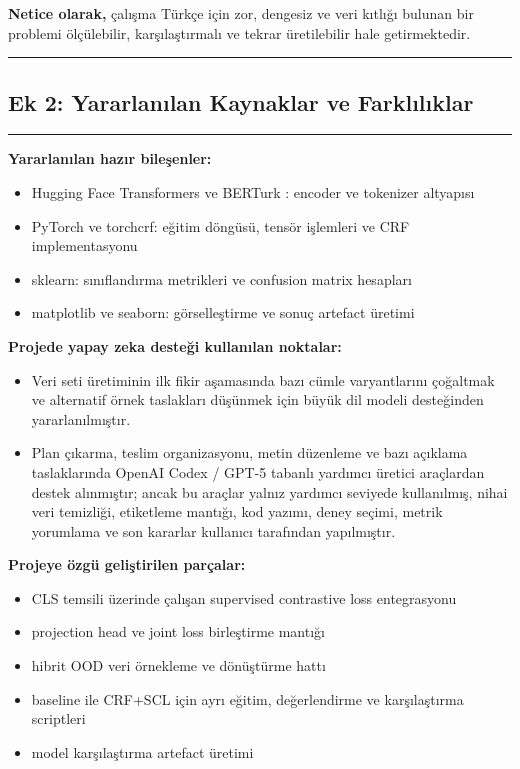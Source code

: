 \documentclass[conference]{IEEEtran}
\begin{document}
\textbf{Netice olarak,} çalışma Türkçe için zor, dengesiz ve veri kıtlığı bulunan bir problemi ölçülebilir, karşılaştırmalı ve tekrar üretilebilir hale getirmektedir.

\noindent\rule{\textwidth}{1pt}
\subsection*{\Large Ek 2: Yararlanılan Kaynaklar ve Farklılıklar}
\noindent\rule{\textwidth}{0.5pt}

\textbf{Yararlanılan hazır bileşenler:}
\begin{itemize}
    \item Hugging Face Transformers ve BERTurk \cite{stefanit}: encoder ve tokenizer altyapısı
    \item PyTorch ve torchcrf: eğitim döngüsü, tensör işlemleri ve CRF implementasyonu
    \item sklearn: sınıflandırma metrikleri ve confusion matrix hesapları
    \item matplotlib ve seaborn: görselleştirme ve sonuç artefact üretimi
\end{itemize}

\textbf{Projede yapay zeka desteği kullanılan noktalar:}
\begin{itemize}
    \item Veri seti üretiminin ilk fikir aşamasında bazı cümle varyantlarını çoğaltmak ve alternatif örnek taslakları düşünmek için büyük dil modeli desteğinden yararlanılmıştır.
    \item Plan çıkarma, teslim organizasyonu, metin düzenleme ve bazı açıklama taslaklarında OpenAI Codex / GPT-5 tabanlı yardımcı üretici araçlardan destek alınmıştır; ancak bu araçlar yalnız yardımcı seviyede kullanılmış, nihai veri temizliği, etiketleme mantığı, kod yazımı, deney seçimi, metrik yorumlama ve son kararlar kullanıcı tarafından yapılmıştır.
\end{itemize}

\textbf{Projeye özgü geliştirilen parçalar:}
\begin{itemize}
    \item CLS temsili üzerinde çalışan supervised contrastive loss entegrasyonu
    \item projection head ve joint loss birleştirme mantığı
    \item hibrit OOD veri örnekleme ve dönüştürme hattı
    \item baseline ile CRF+SCL için ayrı eğitim, değerlendirme ve karşılaştırma scriptleri
    \item model karşılaştırma artefact üretimi
\end{itemize}
\end{document}
